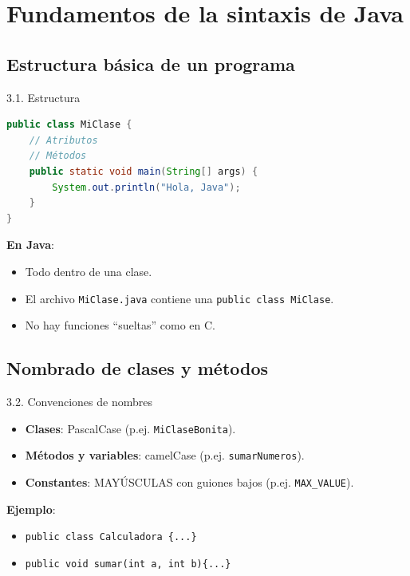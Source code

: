 \documentclass{beamer}
\begin{document}
\section{Fundamentos de la sintaxis de Java}

\subsection{Estructura básica de un programa}

\begin{frame}[fragile]{3.1. Estructura}
\begin{lstlisting}[language=Java]
public class MiClase {
    // Atributos
    // Métodos
    public static void main(String[] args) {
        System.out.println("Hola, Java");
    }
}
\end{lstlisting}

\textbf{En Java}:
\begin{itemize}
  \item Todo dentro de una clase.
  \item El archivo \texttt{MiClase.java} contiene una \texttt{public class MiClase}.
  \item No hay funciones “sueltas” como en C.
\end{itemize}
\end{frame}

\subsection{Nombrado de clases y métodos}

\begin{frame}{3.2. Convenciones de nombres}
\begin{itemize}
  \item \textbf{Clases}: PascalCase (p.ej. \texttt{MiClaseBonita}).
  \item \textbf{Métodos y variables}: camelCase (p.ej. \texttt{sumarNumeros}).
  \item \textbf{Constantes}: MAYÚSCULAS con guiones bajos (p.ej. \texttt{MAX\_VALUE}).
\end{itemize}

\textbf{Ejemplo}:
\begin{itemize}
  \item \texttt{public class Calculadora \{...\}}
  \item \texttt{public void sumar(int a, int b)\{...\}}
\end{itemize}
\end{frame}
\end{document}
